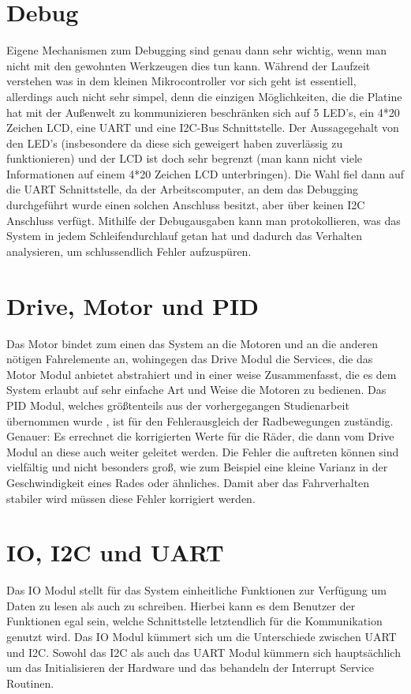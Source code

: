 \section{Debug}
Eigene Mechanismen zum Debugging sind genau dann sehr wichtig, wenn man nicht mit den
gewohnten Werkzeugen dies tun kann. Während der Laufzeit verstehen was in dem kleinen
Mikrocontroller vor sich geht ist essentiell, allerdings auch nicht sehr simpel, denn
die einzigen Möglichkeiten, die die Platine hat mit der Außenwelt zu kommunizieren
beschränken sich auf 5 LED's, ein 4*20 Zeichen LCD, eine UART und eine I2C-Bus 
Schnittstelle. Der Aussagegehalt von den LED's (insbesondere da diese sich geweigert
haben zuverlässig zu funktionieren) und der LCD ist doch sehr begrenzt (man kann nicht
viele Informationen auf einem 4*20 Zeichen LCD unterbringen). Die Wahl fiel dann auf
die UART Schnittstelle, da der Arbeitscomputer, an dem das Debugging durchgeführt wurde
einen solchen Anschluss besitzt, aber über keinen I2C Anschluss verfügt.
Mithilfe der Debugausgaben kann man protokollieren, was das System in jedem
Schleifendurchlauf getan hat und dadurch das Verhalten analysieren, um schlussendlich
Fehler aufzuspüren. 
\section{Drive, Motor und PID}
Das Motor bindet zum einen das System an die Motoren und an die anderen nötigen
Fahrelemente an, wohingegen das Drive Modul die Services, die das Motor Modul anbietet
abstrahiert und in einer weise Zusammenfasst, die es dem System erlaubt auf sehr einfache
Art und Weise die Motoren zu bedienen.
Das PID Modul, welches größtenteils aus der vorhergegangen Studienarbeit übernommen wurde
\cite{STUD_TIMO}, ist für den Fehlerausgleich der Radbewegungen zuständig. Genauer: Es
errechnet die korrigierten Werte für die Räder, die dann vom Drive Modul an diese auch
weiter geleitet werden. Die Fehler die auftreten können sind vielfältig und nicht besonders
groß, wie zum Beispiel eine kleine Varianz in der Geschwindigkeit eines Rades oder ähnliches.
Damit aber das Fahrverhalten stabiler wird müssen diese Fehler korrigiert werden.
\section{IO, I2C und UART}
Das IO Modul stellt für das System einheitliche Funktionen zur Verfügung um Daten zu lesen als
auch zu schreiben. Hierbei kann es dem Benutzer der Funktionen egal sein, welche Schnittstelle
letztendlich für die Kommunikation genutzt wird. Das IO Modul kümmert sich um die Unterschiede
zwischen UART und I2C.
Sowohl das I2C als auch das UART Modul kümmern sich hauptsächlich um das Initialisieren der
Hardware und das behandeln der Interrupt Service Routinen.

